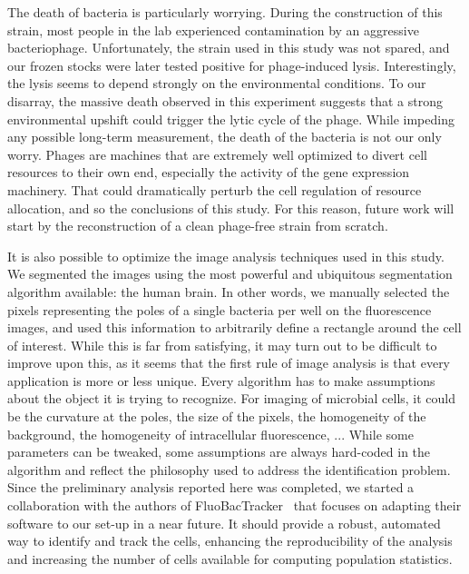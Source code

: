 The death of bacteria is particularly worrying.
During the construction of this strain, most people in the lab experienced contamination by an aggressive bacteriophage.
Unfortunately, the strain used in this study was not spared, and our frozen stocks were later tested positive for phage-induced lysis.
Interestingly, the lysis seems to depend strongly on the environmental conditions.
To our disarray, the massive death observed in this experiment suggests that a strong environmental upshift could trigger the lytic cycle of the phage.
While impeding any possible long-term measurement, the death of the bacteria is not our only worry.
Phages are machines that are extremely well optimized to divert cell resources to their own end, especially the activity of the gene expression machinery.
That could dramatically perturb the cell regulation of resource allocation, and so the conclusions of this study.
For this reason, future work will start by the reconstruction of a clean phage-free strain from scratch.

It is also possible to optimize the image analysis techniques used in this study.
We segmented the images using the most powerful and ubiquitous segmentation algorithm available: the human brain.
In other words, we manually selected the pixels representing the poles of a single bacteria per well on the fluorescence images, and used this information to arbitrarily define a rectangle around the cell of interest.
While this is far from satisfying, it may turn out to be difficult to improve upon this, as it seems that the first rule of image analysis is that every application is more or less unique.
Every algorithm has to make assumptions about the object it is trying to recognize.
For imaging of microbial cells, it could be the curvature at the poles, the size of the pixels, the homogeneity of the background, the homogeneity of intracellular fluorescence, ...
While some parameters can be tweaked, some assumptions are always hard-coded in the algorithm and reflect the philosophy used to address the identification problem.
Since the preliminary analysis reported here was completed, we started a collaboration with the authors of FluoBacTracker~\cite{fluobactracker} that focuses on adapting their software to our set-up in a near future.
It should provide a robust, automated way to identify and track the cells, enhancing the reproducibility of the analysis and increasing the number of cells available for computing population statistics.

